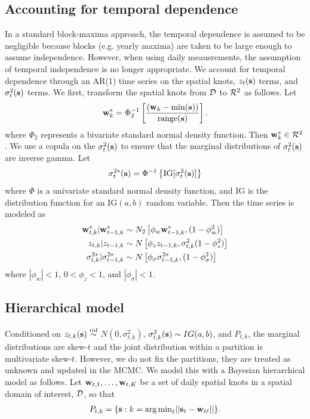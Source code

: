 \documentclass[11pt]{article}
\begin{document}
\subsection{Accounting for temporal dependence} \label{s:temporal}
In a standard block-maxima approach, the temporal dependence is assumed to be negligible because blocks (e.g. yearly maxima) are taken to be large enough to assume independence.
However, when using daily meausrements, the assumption of temporal independence is no longer appropriate.
We account for temporal dependence through an AR(1) time series on the spatial knots, $z_t(\mbox{\bf s})$ terms, and $\sigma^2_t(\mbox{\bf s})$ terms.
We first, transform the spatial knots from ${\cal D}$ to ${\cal R}^2$ as follows.
Let
\begin{align*}
  \mbox{\bf w}^*_k = \Phi^{-1}_2\left[ \frac{ (\mbox{\bf w}_k - \min(\mbox{\bf s}))}{ \text{range}(\mbox{\bf s}) } \right].
\end{align*}
where $\Phi_2$ represents a bivariate standard normal density function.
Then $\mbox{\bf w}^*_k \in {\cal R}^2$.
We use a copula on the $\sigma^2_t(\mbox{\bf s})$ to ensure that the marginal distributions of $\sigma^2_t(\mbox{\bf s})$ are inverse gamma.
Let
\begin{align*}
  \sigma^{2*}_t(\mbox{\bf s}) =\Phi^{-1}\left\{ \text{IG}[\sigma^2_t(\mbox{\bf s})] \right\}
\end{align*}
where $\Phi$ is a univariate standard normal density function, and IG is the distribution function for an IG$(a, b)$ random variable.
Then the time series is modeled as
\begin{align}
  \mbox{\bf w}^*_{t, k} | \mbox{\bf w}^*_{t-1, k} &\sim N_2\left[\phi_w \mbox{\bf w}^*_{t-1, k}, (1 - \phi_w^2) \right] \\
  z_{t, k} | z_{t-1, k} &\sim N \left[\phi_z z_{t-1, k}, \sigma^2_{t,k} (1 - \phi_z^2)\right] \\
  \sigma^{2*}_{t, k} | \sigma^{2*}_{t-1, k} &\sim N \left[\phi_\sigma \sigma^{2*}_{t-1, k}, (1 - \phi_\sigma^2) \right]
\end{align}
where $|\phi_w| < 1$, $0 < \phi_z < 1$, and $|\phi_\sigma| < 1$.

\subsection{Hierarchical model}\label{s:hier}
Conditioned on $z_{t,k}(\mbox{\bf s}) \stackrel{iid}{\sim} $ $N(0, \sigma^2_{t,k})$, $\sigma^2_{t,k}(\mbox{\bf s}) \sim IG(a, b)$, and $P_{t,k}$, the marginal distributions are skew-$t$ and the joint distribution within a partition is multivariate skew-$t$.
However, we do not fix the partitions, they are treated as unknown and updated in the MCMC.
We model this with a Bayesian hierarchical model as follows.
Let $\mbox{\bf w}_{t,1}, \ldots, \mbox{\bf w}_{t,K}$ be a set of daily spatial knots in a spatial domain of interest, ${\cal D}$, so that
\begin{align*}
 P_{t,k} = \{\mbox{\bf s} : k = {\mathop{\rm arg\, min}}_\ell || \mbox{\bf s}_t - \mbox{\bf w}_{t\ell} ||\}.
\end{align*}
\end{document}
